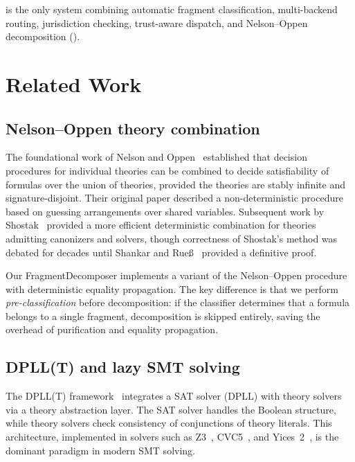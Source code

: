 \documentclass[11pt]{article}
\begin{document}
\JuGeo{} is the only system combining automatic fragment
classification, multi-backend routing, jurisdiction checking,
trust-aware dispatch, and Nelson--Oppen decomposition
().

\section{Related Work}\label{sec:related}

\subsection{Nelson--Oppen theory combination}

The foundational work of Nelson and Oppen~\cite{nelson-oppen}
established that decision procedures for individual theories
can be combined to decide satisfiability of formulas over
the union of theories, provided the theories are
stably infinite and signature-disjoint.  Their original
paper described a non-deterministic procedure based on
guessing arrangements over shared variables.  Subsequent
work by Shostak~\cite{shostak} provided a more efficient
deterministic combination for theories admitting
canonizers and solvers, though correctness of Shostak's
method was debated for decades until Shankar and
Rue{\ss}~\cite{shankar-ruess} provided a definitive proof.

Our FragmentDecomposer implements a variant of the
Nelson--Oppen procedure with deterministic equality
propagation.  The key difference is that we perform
\emph{pre-classification} before decomposition: if the
classifier determines that a formula belongs to a
single fragment, decomposition is skipped entirely,
saving the overhead of purification and equality
propagation.

\subsection{DPLL(T) and lazy SMT solving}

The DPLL(T) framework~\cite{smt-survey} integrates a
SAT solver (DPLL) with theory solvers via a theory
abstraction layer.  The SAT solver handles the Boolean
structure, while theory solvers check consistency of
conjunctions of theory literals.  This architecture,
implemented in solvers such as Z3~\cite{z3},
CVC5~\cite{cvc5}, and Yices~2~\cite{yices2}, is
the dominant paradigm in modern SMT solving.
\end{document}
